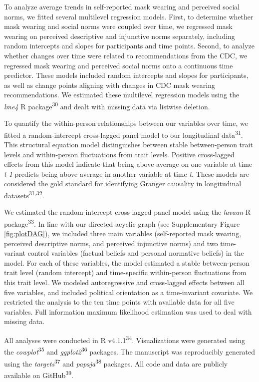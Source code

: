\documentclass[
  man, donotrepeattitle,floatsintext]{apa6}
\begin{document}
To analyze average trends in self-reported mask wearing and perceived social norms, we fitted several multilevel regression models. First, to determine whether mask wearing and social norms were coupled over time, we regressed mask wearing on perceived descriptive and injunctive norms separately, including random intercepts and slopes for participants and time points. Second, to analyze whether changes over time were related to recommendations from the CDC, we regressed mask wearing and perceived social norms onto a continuous time predictor. These models included random intercepts and slopes for participants, as well as change points aligning with changes in CDC mask wearing recommendations. We estimated these multilevel regression models using the \emph{lme4} R package\textsuperscript{30} and dealt with missing data via listwise deletion.

To quantify the within-person relationships between our variables over time, we fitted a random-intercept cross-lagged panel model to our longitudinal data\textsuperscript{31}. This structural equation model distinguishes between stable between-person trait levels and within-person fluctuations from trait levels. Positive cross-lagged effects from this model indicate that being above average on one variable at time \emph{t-1} predicts being above average in another variable at time \emph{t}. These models are considered the gold standard for identifying Granger causality in longitudinal datasets\textsuperscript{31,32}.

We estimated the random-intercept cross-lagged panel model using the \emph{lavaan} R package\textsuperscript{33}. In line with our directed acyclic graph (see Supplementary Figure \ref{fig:plotDAG}), we included three main variables (self-reported mask wearing, perceived descriptive norms, and perceived injunctive norms) and two time-variant control variables (factual beliefs and personal normative beliefs) in the model. For each of these variables, the model estimated a stable between-person trait level (random intercept) and time-specific within-person fluctuations from this trait level. We modeled autoregressive and cross-lagged effects between all five variables, and included political orientation as a time-invariant covariate. We restricted the analysis to the ten time points with available data for all five variables. Full information maximum likelihood estimation was used to deal with missing data.

All analyses were conducted in R v4.1.1\textsuperscript{34}. Visualizations were generated using the \emph{cowplot}\textsuperscript{35} and \emph{ggplot2}\textsuperscript{36} packages. The manuscript was reproducibly generated using the \emph{targets}\textsuperscript{37} and \emph{papaja}\textsuperscript{38} packages. All code and data are publicly available on GitHub\textsuperscript{39}.
\end{document}
